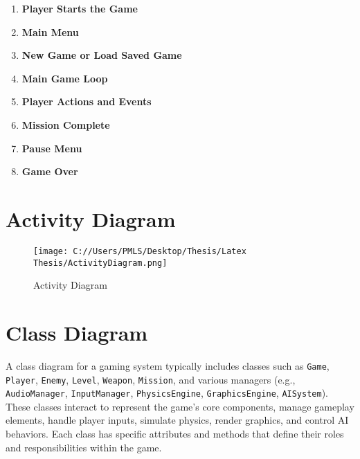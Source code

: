 \begin{enumerate}
	\item \textbf{Player Starts the Game}
	
	\item \textbf{Main Menu}

	\item \textbf{New Game or Load Saved Game}
	
	\item \textbf{Main Game Loop}
	
	\item \textbf{Player Actions and Events}


	\item \textbf{Mission Complete}
	
	\item \textbf{Pause Menu}
	
	\item \textbf{Game Over}

\end{enumerate}
\section{Activity Diagram}
\begin{figure}[H]
	\centering
    \texttt{[image: C://Users/PMLS/Desktop/Thesis/Latex Thesis/ActivityDiagram.png]}
	\caption{Activity Diagram}
	\label{fig:Activity Diagram}
\end{figure}
\section{Class Diagram}
A class diagram for a gaming system typically includes classes such as \texttt{Game}, \texttt{Player}, \texttt{Enemy}, \texttt{Level}, \texttt{Weapon}, \texttt{Mission}, and various managers (e.g., \texttt{AudioManager}, \texttt{InputManager}, \texttt{PhysicsEngine}, \texttt{GraphicsEngine}, \texttt{AISystem}). These classes interact to represent the game's core components, manage gameplay elements, handle player inputs, simulate physics, render graphics, and control AI behaviors. Each class has specific attributes and methods that define their roles and responsibilities within the game.

